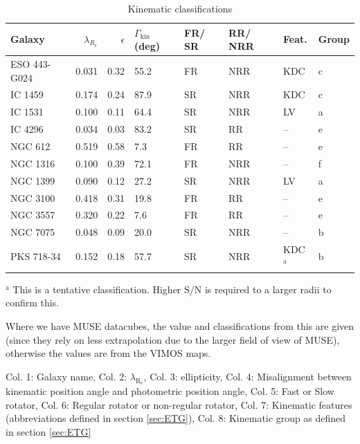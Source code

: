 		\begin{table}
			\centering
		\begin{threeparttable}
			\caption{Kinematic classifications}
			\label{tab:classify}
			\begin{tabular}{l r r p{0.7cm} l l l l}
				\hline
				\hline
				Galaxy		& $\lambda_{R_e}$ & $\epsilon$  & $\Gamma_\text{kin}$ (deg) & FR/ SR 	& RR/ NRR 	& Feat. & Group 	\\
				\hline 
				ESO 443-G024 & 0.031 & 0.32 & 55.2 	& FR & NRR & KDC & c \\
				IC 1459 	& 0.174 & 0.24 & 87.9	& SR & NRR & KDC & c \\
				IC 1531 	& 0.100 & 0.11 & 64.4 	& SR & NRR & LV & a \\
				IC 4296		& 0.034 & 0.03 & 83.2 	& SR & RR & -- & e \\
				NGC 612 	& 0.519 & 0.58 & \leavevmode\phantom{0}7.3 	& FR & RR & -- & e \\
				NGC 1316 	& 0.100 & 0.39 & 72.1 	& FR & NRR & -- & f \\
				NGC 1399 	& 0.090 & 0.12 & 27.2 	& SR & NRR & LV & a \\
				NGC 3100 	& 0.418 & 0.31 & 19.8 	& FR & RR & -- & e \\
				NGC 3557 	& 0.320 & 0.22 & \leavevmode\phantom{0}7.6 	& FR & RR & -- & e\\
				NGC 7075 	& 0.048 & 0.09 & 20.0 	& SR & NRR & -- & b \\
				PKS 718-34  & 0.152 & 0.18 & 57.7 	& SR & NRR & KDC$^\text{a}$ & b\\
				\hline
				\hline
			\end{tabular}
			\begin{tablenotes}
			\small
			\item $^\text{a}$ This is a tentative classification. Higher S/N is required to a larger radii to confirm this.
			\item Where we have MUSE datacubes, the value and classifications from this are given (since they rely on less extrapolation due to the larger field of view of MUSE), otherwise the values are from the VIMOS maps. 
			\item Col. 1: Galaxy name, Col. 2: $\lambda_\mathrm{R_e}$, Col. 3: ellipticity, Col. 4: Misalignment between kinematic position angle and photometric position angle, Col. 5: Fast or Slow rotator, Col. 6: Regular rotator or non-regular rotator, Col. 7: Kinematic features (abbreviations defined in section \ref{sec:ETG}), Col. 8: Kinematic group as defined in section \ref{sec:ETG}
			\end{tablenotes}
		\end{threeparttable}
		\end{table}

